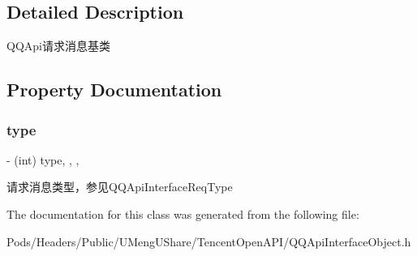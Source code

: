 \subsection{Detailed Description}
Q\+Q\+Api请求消息基类 

\subsection{Property Documentation}
\mbox{\label{interface_q_q_base_req_aa12984f100b018da0137a268faa4335d}} 
\subsubsection{\texorpdfstring{type}{type}}
{\footnotesize\ttfamily -\/ (int) type\hspace{0.3cm}{\ttfamily [read]}, {\ttfamily [write]}, {\ttfamily [nonatomic]}, {\ttfamily [assign]}}

请求消息类型，参见Q\+Q\+Api\+Interface\+Req\+Type 

The documentation for this class was generated from the following file\+:\begin{DoxyCompactItemize}
\item 
Pods/\+Headers/\+Public/\+U\+Meng\+U\+Share/\+Tencent\+Open\+A\+P\+I/Q\+Q\+Api\+Interface\+Object.\+h\end{DoxyCompactItemize}
